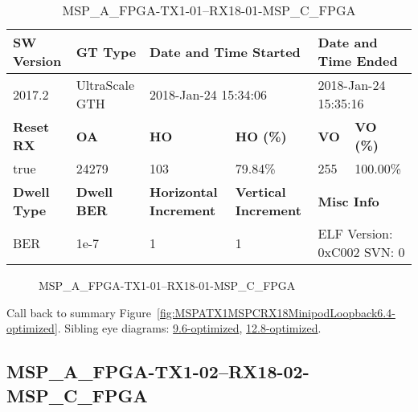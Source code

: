 \begin{table}[h]
\centering
\caption{MSP\_A\_FPGA-TX1-01--RX18-01-MSP\_C\_FPGA}
\label{tab:MSPAFPGATX101RX1801MSPCFPGA6.4-optimized}
\begin{tabular}{@{}|l|l|l|l|l|l|@{}}
\toprule
\textbf{SW Version}                & \textbf{GT Type}   & \multicolumn{2}{l|}{\textbf{Date and Time Started}}            & \multicolumn{2}{l|}{\textbf{Date and Time Ended}}        \\ \midrule
2017.2                       & UltraScale GTH          & \multicolumn{2}{l|}{2018-Jan-24 15:34:06}                   & \multicolumn{2}{l|}{2018-Jan-24 15:35:16}               \\ \midrule
\textbf{Reset RX}                  & \textbf{OA} & \textbf{HO}   & \textbf{HO (\%)} & \textbf{VO} & \textbf{VO (\%)} \\ \midrule
true & 24279        & 103          & 79.84\%        & 255        & 100.00\%       \\ \midrule
\textbf{Dwell Type}                & \textbf{Dwell BER} & \textbf{Horizontal Increment} & \textbf{Vertical Increment}    & \multicolumn{2}{l|}{\textbf{Misc Info}}                  \\ \midrule
BER                            & 1e-7        & 1        & 1           & \multicolumn{2}{l|}{ELF Version: 0xC002 SVN: 0}                         \\ \bottomrule
\end{tabular}
\end{table}

\begin{figure}[h]
\caption{MSP\_A\_FPGA-TX1-01--RX18-01-MSP\_C\_FPGA} \label{fig:MSPAFPGATX101RX1801MSPCFPGA6.4-optimized}
\end{figure}

Call back to summary Figure~\ref{fig:MSPATX1MSPCRX18MinipodLoopback6.4-optimized}.
Sibling eye diagrams: \hyperref[sec:MSPAFPGATX101RX1801MSPCFPGA9.6-optimized]{9.6-optimized}, \hyperref[sec:MSPAFPGATX101RX1801MSPCFPGA12.8-optimized]{12.8-optimized}.

\clearpage
\newpage


\subsection{MSP\_A\_FPGA-TX1-02--RX18-02-MSP\_C\_FPGA}\label{sec:MSPAFPGATX102RX1802MSPCFPGA6.4-optimized}

